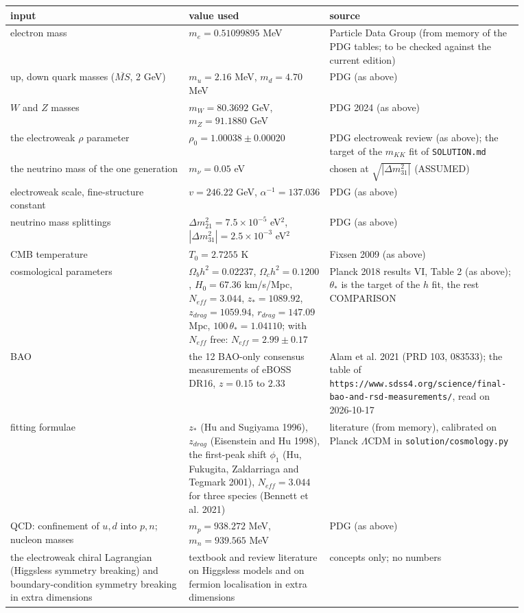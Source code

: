 \documentclass[11pt]{article}
\begin{document}
\begin{longtable}{>{\raggedright\arraybackslash}p{0.334\linewidth}>{\raggedright\arraybackslash}p{0.261\linewidth}>{\raggedright\arraybackslash}p{0.273\linewidth}}
\toprule
\textbf{input} & \textbf{value used} & \textbf{source} \\
\midrule
electron mass & $m_e = 0.51099895$ MeV & Particle Data Group (from memory of the PDG tables; to be checked against the current edition) \\
up, down quark masses ($\overline{MS}$, 2 GeV) & $m_u = 2.16$ MeV, $m_d = 4.70$ MeV & PDG (as above) \\
$W$ and $Z$ masses & $m_W = 80.3692$ GeV, $m_Z = 91.1880$ GeV & PDG 2024 (as above) \\
the electroweak $\rho$ parameter & $\rho_0 = 1.00038 \pm 0.00020$ & PDG electroweak review (as above); the target of the $m_{KK}$ fit of \texttt{SOLUTION.\allowbreak{}md} \\
the neutrino mass of the one generation & $m_\nu = 0.05$ eV & chosen at $\sqrt{|\Delta m^2_{31}|}$ (ASSUMED) \\
electroweak scale, fine-structure constant & $v = 246.22$ GeV, $\alpha^{-1} = 137.036$ & PDG (as above) \\
neutrino mass splittings & $\Delta m^2_{21} = 7.5\times10^{-5}$ eV$^2$, $|\Delta m^2_{31}| = 2.5\times10^{-3}$ eV$^2$ & PDG (as above) \\
CMB temperature & $T_0 = 2.7255$ K & Fixsen 2009 (as above) \\
cosmological parameters & $\Omega_bh^2 = 0.02237$, $\Omega_ch^2 = 0.1200$, $H_0 = 67.36$ km/s/Mpc, $N_{eff} = 3.044$, $z_* = 1089.92$, $z_{drag} = 1059.94$, $r_{drag} = 147.09$ Mpc, $100\,\theta_* = 1.04110$; with $N_{eff}$ free: $N_{eff} = 2.99 \pm 0.17$ & Planck 2018 results VI, Table 2 (as above); $\theta_*$ is the target of the $h$ fit, the rest COMPARISON \\
BAO & the 12 BAO-only consensus measurements of eBOSS DR16, $z = 0.15$ to $2.33$ & Alam et al. 2021 (PRD 103, 083533); the table of \texttt{https:/\allowbreak{}/\allowbreak{}www.\allowbreak{}sdss4.\allowbreak{}org/\allowbreak{}science/\allowbreak{}final-{}\allowbreak{}bao-{}\allowbreak{}and-{}\allowbreak{}rsd-{}\allowbreak{}measurements/\allowbreak{}}, read on 2026-10-17 \\
fitting formulae & $z_*$ (Hu and Sugiyama 1996), $z_{drag}$ (Eisenstein and Hu 1998), the first-peak shift $\phi_1$ (Hu, Fukugita, Zaldarriaga and Tegmark 2001), $N_{eff} = 3.044$ for three species (Bennett et al. 2021) & literature (from memory), calibrated on Planck $\Lambda$CDM in \texttt{solution/\allowbreak{}cosmology.\allowbreak{}py} \\
QCD: confinement of $u, d$ into $p, n$; nucleon masses & $m_p = 938.272$ MeV, $m_n = 939.565$ MeV & PDG (as above) \\
the electroweak chiral Lagrangian (Higgsless symmetry breaking) and boundary-condition symmetry breaking in extra dimensions & textbook and review literature on Higgsless models and on fermion localisation in extra dimensions & concepts only; no numbers \\
\bottomrule
\end{longtable}
\end{document}
